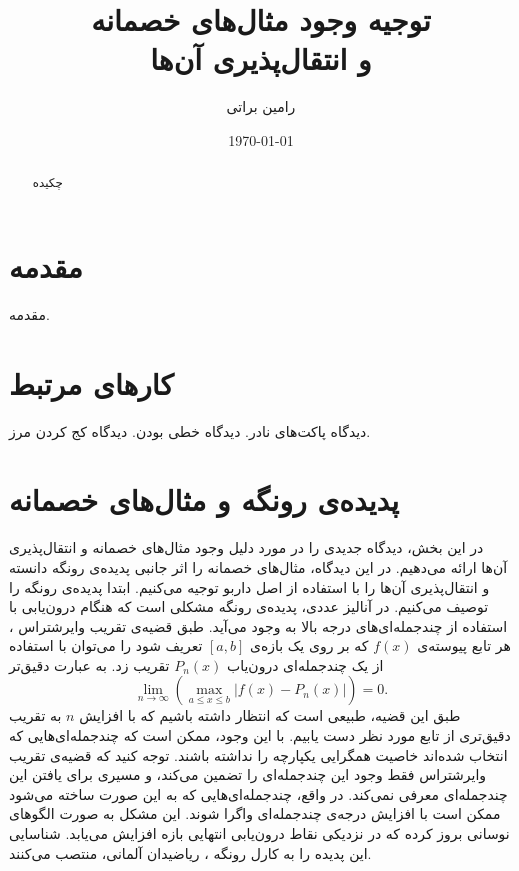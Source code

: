 \documentclass[12pt,onecolumn,a4paper]{article}
\begin{document}
\title{توجیه وجود مثال‌های خصمانه \\ و انتقال‌پذیری آن‌ها} 
\author{رامین براتی}
\date{\today}
\maketitle

\begin{abstract}
چکیده
\end{abstract}

\section{مقدمه} 
مقدمه.

\section{کارهای مرتبط}
دیدگاه پاکت‌های نادر.
دیدگاه خطی بودن.
دیدگاه کج کردن مرز.

\section{پدیده‌ی رونگه و مثال‌های خصمانه}
در این بخش، دیدگاه جدیدی را در مورد دلیل وجود مثال‌های خصمانه و انتقال‌پذیری آن‌ها ارائه می‌دهیم. در این دیدگاه، مثال‌های خصمانه را اثر جانبی پدیده‌ی رونگه دانسته و انتقال‌پذیری آن‌ها را با استفاده از اصل داربو توجیه می‌کنیم. ابتدا پدیده‌ی رونگه را توصیف می‌کنیم. در آنالیز عددی، پدیده‌ی رونگه مشکلی است که هنگام درون‌یابی با استفاده از چندجمله‌ای‌های درجه بالا به وجود می‌آید. طبق قضیه‌ی تقریب وایرشتراس
،
هر تابع پیوسته‌ی 
$f(x)$
که بر روی یک بازه‌ی
$[a,b]$
تعریف شود را می‌توان با استفاده از یک چندجمله‌ای درون‌یاب
$P_n(x)$
تقریب زد. به عبارت دقیق‌تر
\begin{equation*}
    \lim_{n\rightarrow \infty}\left(\max _{{a\leq x\leq b}}\left|f(x)-P_{n}(x)\right|\right)=0.
\end{equation*}
طبق این قضیه، طبیعی است که انتظار داشته باشیم که با افزایش 
$n$
به تقریب دقیق‌تری از تابع مورد نظر دست یابیم. با این وجود، ممکن است که چندجمله‌ای‌هایی که انتخاب شده‌اند خاصیت همگرایی یکپارچه را نداشته باشند. توجه کنید که قضیه‌ی تقریب وایرشتراس فقط وجود این چندجمله‌ای را تضمین می‌کند، و مسیری برای یافتن این چندجمله‌ای معرفی نمی‌کند. در واقع، چندجمله‌ای‌هایی که به این صورت ساخته می‌شود ممکن است با افزایش درجه‌ی چندجمله‌ای واگرا شوند. این مشکل به صورت الگوهای نوسانی بروز کرده که در نزدیکی نقاط درون‌یابی انتهایی بازه افزایش می‌یابد. شناسایی این پدیده را به  کارل رونگه
،
ریاضیدان آلمانی، منتصب می‌کنند.
\end{document}
